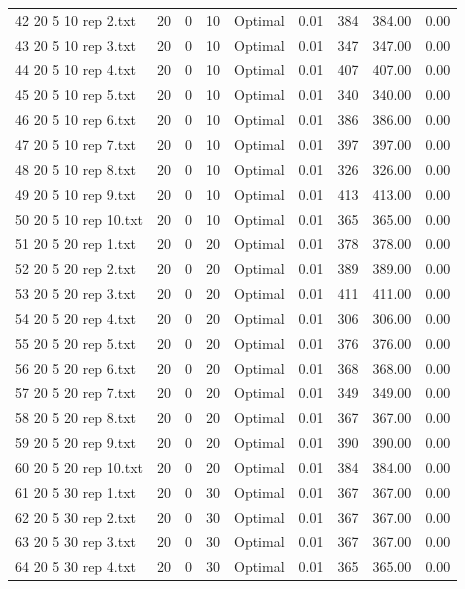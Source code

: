 \begin{longtable}{lrrllrrrr}
42 20 5 10 rep 2.txt & 20 & 0 & 10 & Optimal &  0.01 & 384 & 384.00 &  0.00\\
43 20 5 10 rep 3.txt & 20 & 0 & 10 & Optimal &  0.01 & 347 & 347.00 &  0.00\\
44 20 5 10 rep 4.txt & 20 & 0 & 10 & Optimal &  0.01 & 407 & 407.00 &  0.00\\
45 20 5 10 rep 5.txt & 20 & 0 & 10 & Optimal &  0.01 & 340 & 340.00 &  0.00\\
46 20 5 10 rep 6.txt & 20 & 0 & 10 & Optimal &  0.01 & 386 & 386.00 &  0.00\\
47 20 5 10 rep 7.txt & 20 & 0 & 10 & Optimal &  0.01 & 397 & 397.00 &  0.00\\
48 20 5 10 rep 8.txt & 20 & 0 & 10 & Optimal &  0.01 & 326 & 326.00 &  0.00\\
49 20 5 10 rep 9.txt & 20 & 0 & 10 & Optimal &  0.01 & 413 & 413.00 &  0.00\\
50 20 5 10 rep 10.txt & 20 & 0 & 10 & Optimal &  0.01 & 365 & 365.00 &  0.00\\
51 20 5 20 rep 1.txt & 20 & 0 & 20 & Optimal &  0.01 & 378 & 378.00 &  0.00\\
52 20 5 20 rep 2.txt & 20 & 0 & 20 & Optimal &  0.01 & 389 & 389.00 &  0.00\\
53 20 5 20 rep 3.txt & 20 & 0 & 20 & Optimal &  0.01 & 411 & 411.00 &  0.00\\
54 20 5 20 rep 4.txt & 20 & 0 & 20 & Optimal &  0.01 & 306 & 306.00 &  0.00\\
55 20 5 20 rep 5.txt & 20 & 0 & 20 & Optimal &  0.01 & 376 & 376.00 &  0.00\\
56 20 5 20 rep 6.txt & 20 & 0 & 20 & Optimal &  0.01 & 368 & 368.00 &  0.00\\
57 20 5 20 rep 7.txt & 20 & 0 & 20 & Optimal &  0.01 & 349 & 349.00 &  0.00\\
58 20 5 20 rep 8.txt & 20 & 0 & 20 & Optimal &  0.01 & 367 & 367.00 &  0.00\\
59 20 5 20 rep 9.txt & 20 & 0 & 20 & Optimal &  0.01 & 390 & 390.00 &  0.00\\
60 20 5 20 rep 10.txt & 20 & 0 & 20 & Optimal &  0.01 & 384 & 384.00 &  0.00\\
61 20 5 30 rep 1.txt & 20 & 0 & 30 & Optimal &  0.01 & 367 & 367.00 &  0.00\\
62 20 5 30 rep 2.txt & 20 & 0 & 30 & Optimal &  0.01 & 367 & 367.00 &  0.00\\
63 20 5 30 rep 3.txt & 20 & 0 & 30 & Optimal &  0.01 & 367 & 367.00 &  0.00\\
64 20 5 30 rep 4.txt & 20 & 0 & 30 & Optimal &  0.01 & 365 & 365.00 &  0.00\\

\end{longtable}

